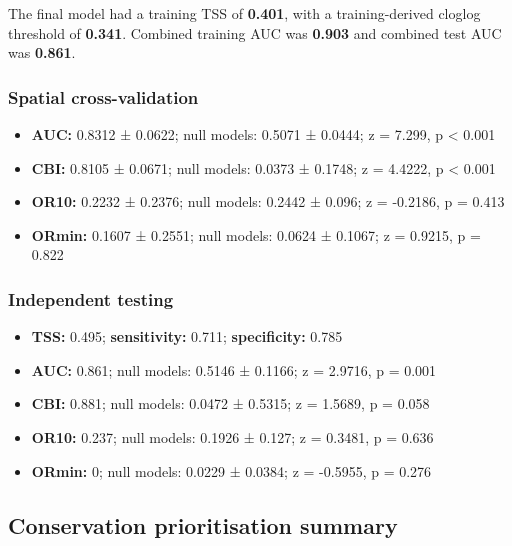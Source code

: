\documentclass[
  openany]{book}
\providecommand{\tightlist}{%
  \setlength{\itemsep}{0pt}\setlength{\parskip}{0pt}}
\providecommand{\tightlist}{%
  \setlength{\itemsep}{0pt}%
  \setlength{\parskip}{0pt}%
}
\begin{document}
The final model had a training TSS of \textbf{0.401}, with a training-derived cloglog threshold of \textbf{0.341}. Combined training AUC was \textbf{0.903} and combined test AUC was \textbf{0.861}.

\subsubsection*{Spatial cross-validation}\label{spatial-cross-validation-5}

\begin{itemize}
\tightlist
\item
  \textbf{AUC:} 0.8312 ± 0.0622; null models: 0.5071 ± 0.0444; z = 7.299, p \textless{} 0.001
\item
  \textbf{CBI:} 0.8105 ± 0.0671; null models: 0.0373 ± 0.1748; z = 4.4222, p \textless{} 0.001
\item
  \textbf{OR10:} 0.2232 ± 0.2376; null models: 0.2442 ± 0.096; z = -0.2186, p = 0.413
\item
  \textbf{ORmin:} 0.1607 ± 0.2551; null models: 0.0624 ± 0.1067; z = 0.9215, p = 0.822
\end{itemize}

\subsubsection*{Independent testing}\label{independent-testing-5}

\begin{itemize}
\tightlist
\item
  \textbf{TSS:} 0.495; \textbf{sensitivity:} 0.711; \textbf{specificity:} 0.785
\item
  \textbf{AUC:} 0.861; null models: 0.5146 ± 0.1166; z = 2.9716, p = 0.001
\item
  \textbf{CBI:} 0.881; null models: 0.0472 ± 0.5315; z = 1.5689, p = 0.058
\item
  \textbf{OR10:} 0.237; null models: 0.1926 ± 0.127; z = 0.3481, p = 0.636
\item
  \textbf{ORmin:} 0; null models: 0.0229 ± 0.0384; z = -0.5955, p = 0.276
\end{itemize}

\subsection*{Conservation prioritisation summary}\label{conservation-prioritisation-summary-5}
\end{document}
